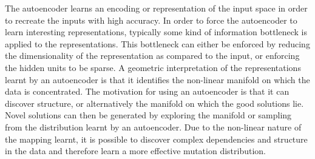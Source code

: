 \documentclass[twoside]{article}
\begin{document}
The autoencoder learns an encoding or representation of the input space in order to recreate the inputs with high accuracy. In order to force the autoencoder to learn interesting representations, typically some kind of information bottleneck is applied to the representations. This bottleneck can either be enforced by reducing the dimensionality of the representation as compared to the input, or enforcing the hidden units to be sparse. A geometric interpretation of the representations learnt by an autoencoder is that it identifies the non-linear manifold on which the data is concentrated. The motivation for using an autoencoder is that it can discover structure, or alternatively the manifold on which the good solutions lie. Novel solutions can then be generated by exploring the manifold or sampling from the distribution learnt by an autoencoder. Due to the non-linear nature of the mapping learnt, it is possible to discover complex dependencies and structure in the data and therefore learn a more effective mutation distribution. 



\end{document}
